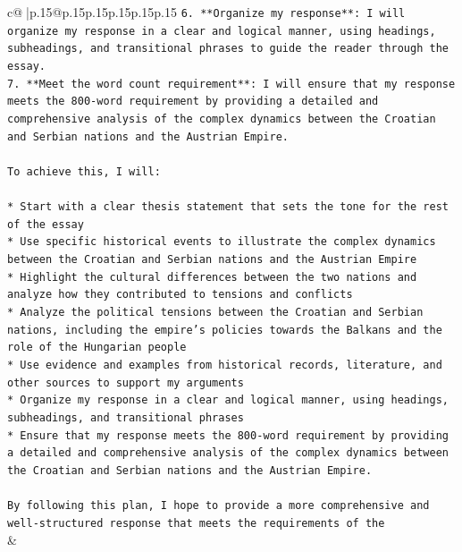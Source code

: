 \documentclass{article}
\begin{document}
{\begin{supertabular}{c@{$\;$}|p{.15\linewidth}@{}p{.15\linewidth}p{.15\linewidth}p{.15\linewidth}p{.15\linewidth}p{.15\linewidth}}
{{{\texttt{6. **Organize my response**: I will organize my response in a clear and logical manner, using headings, subheadings, and transitional phrases to guide the reader through the essay.} \\
\texttt{7. **Meet the word count requirement**: I will ensure that my response meets the 800{-}word requirement by providing a detailed and comprehensive analysis of the complex dynamics between the Croatian and Serbian nations and the Austrian Empire.} \\
\\ 
\texttt{To achieve this, I will:} \\
\\ 
\texttt{* Start with a clear thesis statement that sets the tone for the rest of the essay} \\
\texttt{* Use specific historical events to illustrate the complex dynamics between the Croatian and Serbian nations and the Austrian Empire} \\
\texttt{* Highlight the cultural differences between the two nations and analyze how they contributed to tensions and conflicts} \\
\texttt{* Analyze the political tensions between the Croatian and Serbian nations, including the empire's policies towards the Balkans and the role of the Hungarian people} \\
\texttt{* Use evidence and examples from historical records, literature, and other sources to support my arguments} \\
\texttt{* Organize my response in a clear and logical manner, using headings, subheadings, and transitional phrases} \\
\texttt{* Ensure that my response meets the 800{-}word requirement by providing a detailed and comprehensive analysis of the complex dynamics between the Croatian and Serbian nations and the Austrian Empire.} \\
\\ 
\texttt{By following this plan, I hope to provide a more comprehensive and well{-}structured response that meets the requirements of the} \\
            }
        }
    }
    & \\ \\

\end{supertabular}
}
\end{document}
